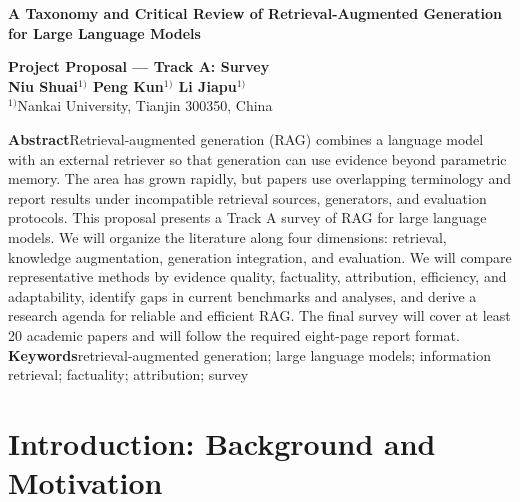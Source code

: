 \documentclass[10.5pt,compsoc]{CjC}
\begin{document}
\pagestyle{CjCheadings}
\thispagestyle{empty}

\begin{strip}
\vspace{-13mm}
\begin{center}
\begin{minipage}{0.96\textwidth}
\centering
{\bfseries A Taxonomy and Critical Review of Retrieval-Augmented Generation for Large Language Models\par}\vspace{3mm}
{\bfseries Project Proposal --- Track A: Survey}\\[4mm]
{\bfseries Niu Shuai$^{1)}$ \quad Peng Kun$^{1)}$ \quad Li Jiapu$^{1)}$}\\[2mm]
{$^{1)}$Nankai University, Tianjin 300350, China}\\[3mm]
\hrulefill\par\vspace{2mm}
\raggedright
{}\textbf{Abstract}\quad Retrieval-augmented generation (RAG) combines a language model with an external retriever so that generation can use evidence beyond parametric memory. The area has grown rapidly, but papers use overlapping terminology and report results under incompatible retrieval sources, generators, and evaluation protocols. This proposal presents a Track A survey of RAG for large language models. We will organize the literature along four dimensions: retrieval, knowledge augmentation, generation integration, and evaluation. We will compare representative methods by evidence quality, factuality, attribution, efficiency, and adaptability, identify gaps in current benchmarks and analyses, and derive a research agenda for reliable and efficient RAG. The final survey will cover at least 20 academic papers and will follow the required eight-page report format.\\[2mm]
\textbf{Keywords}\quad retrieval-augmented generation; large language models; information retrieval; factuality; attribution; survey
\end{minipage}
\end{center}
\end{strip}

\vspace{2mm}
\section{Introduction: Background and Motivation}
\end{document}
